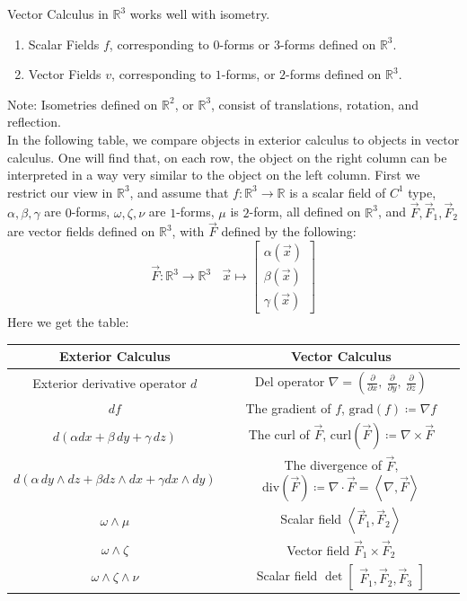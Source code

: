 \documentclass[15pt]{book}
\theoremstyle{break}
\theoremstyle{break}
\newcommand{\R}{\mathbb{R}}
\newcommand{\bmat}[1]{\begin{bmatrix} #1 \end{bmatrix}}
\newcommand{\note}{\color{red}Note: \color{black}}
\begin{document}
Vector Calculus in $\R^3$ works well with isometry.
\begin{enumerate}[topsep=3pt,itemsep=-1ex,partopsep=1ex,parsep=1ex]
\item Scalar Fields $f$, corresponding to $0$-forms or $3$-forms defined on $\R^3$.
\item Vector Fields $v$, corresponding to $1$-forms, or $2$-forms defined on $\R^3$. 
\end{enumerate}

\note Isometries defined on $\R^2$, or $\R^3$, consist of translations, rotation, and reflection. \\

In the following table, we compare objects in exterior calculus to objects in vector calculus. One will find that, on each row, the object on the right column can be interpreted in a way very similar to the object on the left column. First we restrict our view in $\R^3$, and assume that $f:\R^3 \to \R$ is a scalar field of $C^1$ type, $\alpha,\beta,\gamma$ are $0$-forms, $\omega,\zeta,\nu$ are $1$-forms, $\mu$ is $2$-form, all defined on $\R^3$, and $\vec{F}, \vec{F}_1,\vec{F}_2$ are vector fields defined on $\R^3$, with $\vec{F}$ defined by the following:
$$\vec{F}: \R^3 \to \R^3 \ \ \ \ \vec{x}\mapsto \bmat{\alpha(\vec{x})\\ \beta(\vec{x}) \\ \gamma(\vec{x})}$$
Here we get the table:
\begin{center}
\begin{tabular}{|c|c|}
\hline
\cellcolor{orange!29} Exterior Calculus & \cellcolor{blue!29} Vector Calculus \\
\hline
Exterior derivative operator $d$ & Del operator $\nabla = \left(\frac{\partial}{\partial x}, \ \frac{\partial }{\partial y},\ \frac{\partial}{\partial z} \right)$\\
\hline
$df$ & The gradient of $f$, $\text{grad}(f) \coloneqq \nabla f$ \\
\hline
$d(\alpha dx + \beta\, dy + \gamma\, dz)$ & The curl of $\vec{F}$, $\text{curl}(\vec{F}) \coloneqq \nabla \times \vec{F}$\\
\hline
$d\left(\alpha\, dy\wedge dz + \beta dz\wedge dx + \gamma dx\wedge dy\right)$ & The divergence of $\vec{F}$, $\text{div}(\vec{F}) \coloneqq \nabla \cdot \vec{F} = \left< \nabla , \vec{F}\right>$\\
\hline
$\omega \wedge \mu$& Scalar field $\left<\vec{F}_1, \vec{F}_2\right>$\\
\hline
$\omega \wedge \zeta$& Vector field $\vec{F}_1 \times \vec{F}_2$ \\
\hline
$\omega \wedge \zeta \wedge \nu$& Scalar field $\det\bmat{\vec{F}_1,\vec{F}_2,\vec{F}_3}$\\
\hline
\end{tabular}
\end{center}
\end{document}

